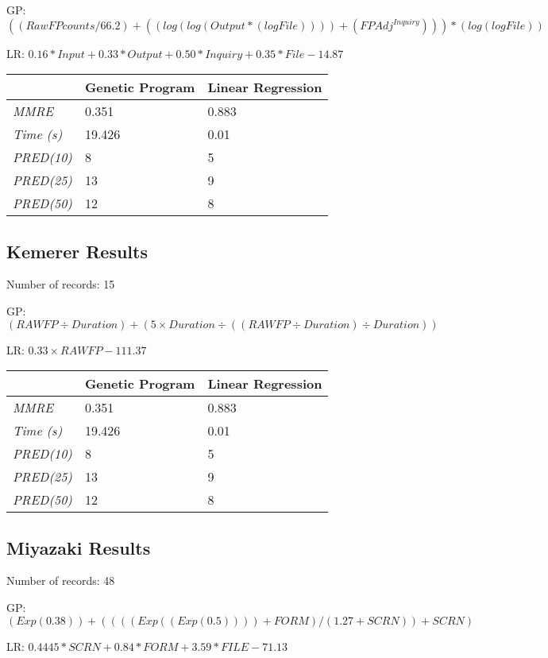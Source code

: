 \documentclass[11pt, a4paper]{article}
\begin{document}
GP:
\(((RawFPcounts / 66.2) + ((log (log (Output * (log File)))) +
(FPAdj ^ {Inquiry}))) * (log (log File))\)

LR:
\(0.16 * Input + 0.33 * Output + 0.50 * Inquiry + 0.35 * File - 14.87\)

\begin{tabularx}{\textwidth}{| l | X | X |}
\hline
 & \textbf{Genetic Program} & \textbf{Linear Regression} \\
\hline
\emph{MMRE} & 0.351 & 0.883 \\
\emph{Time (s)} & 19.426 & 0.01 \\
\emph{PRED(10)} & 8 & 5 \\
\emph{PRED(25)} & 13 & 9 \\
\emph{PRED(50)} & 12 & 8 \\
\hline
\end{tabularx}

\subsection{Kemerer Results} %
\label{sub:kemerer_results}
Number of records: 15

GP: \((RAWFP \div Duration) + (5 \times Duration \div ((RAWFP \div Duration)
\div Duration))\)

LR: \(0.33 \times RAWFP - 111.37\)

\begin{tabularx}{\textwidth}{| l | X | X |}
\hline
 & \textbf{Genetic Program} & \textbf{Linear Regression} \\
\hline
\emph{MMRE} & 0.351 & 0.883 \\
\emph{Time (s)} & 19.426 & 0.01 \\
\emph{PRED(10)} & 8 & 5 \\
\emph{PRED(25)} & 13 & 9 \\
\emph{PRED(50)} & 12 & 8 \\
\hline
\end{tabularx}

\subsection{Miyazaki Results} %
\label{sub:miyazaki_results}
Number of records: 48

GP: \((Exp(0.38)) + ((((Exp((Exp(0.5)))) + FORM) / (1.27 + SCRN)) + SCRN)\)

LR: \(0.4445 * SCRN + 0.84 * FORM + 3.59 * FILE - 71.13\)
\end{document}
